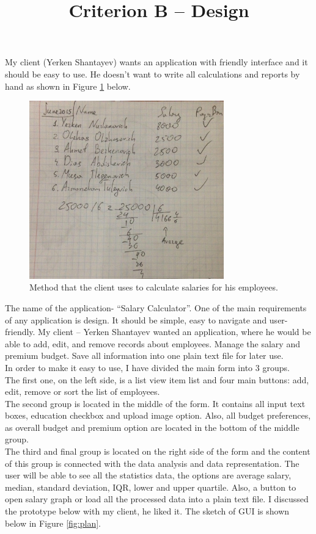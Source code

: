 \documentclass[a4]{article}
\title{Criterion B – Design}
\begin{document}
\maketitle
\newpage
My client (Yerken Shantayev) wants an application with friendly interface and it should be easy to use. He doesn’t want to write all calculations and reports by hand as shown in Figure \ref{fig:old} below.\\

\begin{figure}[h!]
\begin{center}
  \includegraphics[width=0.75\textwidth]{old.jpg}
  \caption{Method that the client uses to calculate salaries for his employees.}
  \label{fig:old}
\end{center}
\end{figure}

The name of the application- “Salary Calculator”. One of the main requirements of any application is design. It should be simple, easy to navigate and user-friendly. My client – Yerken Shantayev wanted an application, where he would be able to add, edit, and remove records about employees. Manage the salary and premium budget. Save all information into one plain text file for later use.\\
In order to make it easy to use, I have divided the main form into 3 groups. \\
The first one, on the left side, is a list view item list and four main buttons: add, edit, remove or sort the list of employees.\\
The second group is located in the middle of the form. It contains all input text boxes, education checkbox and upload image option. Also, all budget preferences, as overall budget and premium option are located in the bottom of the middle group.\\
The third and final group is located on the right side of the form and the content of this group is connected with the data analysis and data representation. The user will be able to see all the statistics data, the options are average salary, median, standard deviation, IQR, lower and upper quartile. Also, a button to open salary graph or load all the processed data into a plain text file. I discussed the prototype below with my client, he liked it. The sketch of GUI is shown below in Figure \ref{fig:plan}.\\
\end{document}
